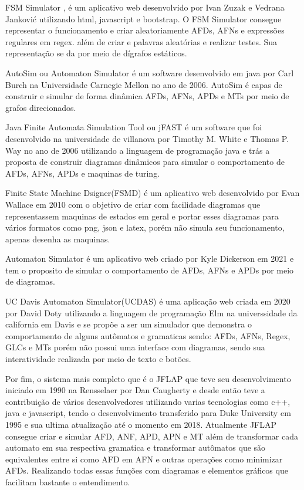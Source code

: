 FSM Simulator \cite{FSMSimulator}, é um aplicativo web desenvolvido por Ivan Zuzak e Vedrana Janković utilizando html, javascript e bootstrap. O FSM Simulator consegue representar o funcionamento e criar aleatoriamente AFDs, AFNs e expressões regulares em regex. além de criar e palavras aleatórias e realizar testes. Sua representação se da por meio de dígrafos estáticos.

AutoSim ou Automaton Simulator \cite{Autosim} é um software desenvolvido em java por Carl Burch na Universidade Carnegie Mellon no ano de 2006. AutoSim é capas de construir e simular de forma dinâmica AFDs, AFNs, APDs e MTs por meio de grafos direcionados.

Java Finite Automata Simulation Tool ou jFAST \cite{jFAST} é um software que foi desenvolvido na universidade de villanova por Timothy M. White e Thomas P. Way no ano de 2006 utilizando a linguagem de programação java e trás a proposta de construir diagramas dinâmicos para simular o comportamento de AFDs, AFNs, APDs e maquinas de turing.

Finite State Machine Dsigner(FSMD) é um aplicativo web desenvolvido por Evan Wallace em 2010 com o objetivo de criar com facilidade diagramas que representassem maquinas de estados em geral e portar esses diagramas para vários formatos como png, json e latex, porém não simula seu funcionamento, apenas desenha as maquinas. 

Automaton Simulator \cite{AutomatonSimulator} é um aplicativo web criado por Kyle Dickerson em 2021 e tem o proposito de simular o comportamento de AFDs, AFNs e APDs por meio de diagramas.

UC Davis Automaton Simulator(UCDAS) \cite{UCDavisAutomatonSimulator} é uma aplicação web criada em 2020 por David Doty utilizando a linguagem de programação Elm na universsidade da california em Davis e se propõe a ser um simulador que demonstra o comportamento de alguns autômatos e gramaticas sendo: AFDs, AFNs, Regex, GLCs e MTs porém não possui uma interface com diagramas, sendo sua interatividade realizada por meio de texto e botões.

Por fim, o sistema mais completo que é o JFLAP \cite{JFLAP} que teve seu desenvolvimento iniciado em 1990 na Rensselaer por Dan Caugherty e desde então teve a contribuição de vários desenvolvedores utilizando varias tecnologias como c++, java e javascript, tendo o desenvolvimento transferido para Duke University em 1995 e sua ultima atualização até o momento em 2018. Atualmente JFLAP consegue criar e simular AFD, ANF, APD, APN e MT além de transformar cada automato em sua respectiva gramatica e transformar autômatos que são equivalentes entre si como AFD em AFN e outras operações como minimizar AFDs. Realizando todas essas funções com diagramas e elementos gráficos que facilitam bastante o entendimento. 

